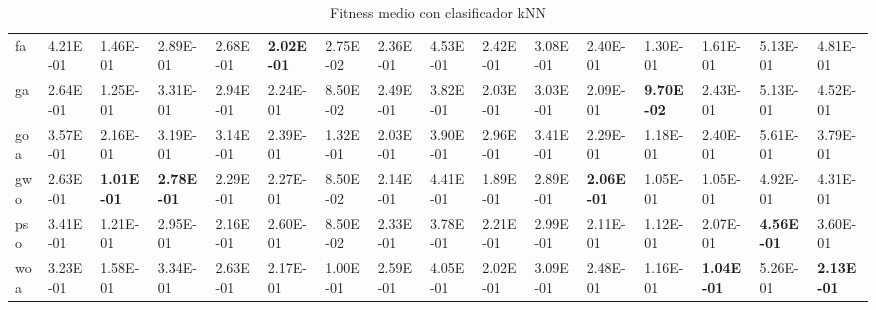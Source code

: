 \begin{table}
\begin{adjustbox}{width=\linewidth}
\begin{tabular}{llllllllllllllll}
            fa        & 4.21E-01          & 1.46E-01          & 2.89E-01          & 2.68E-01          & \textbf{2.02E-01} & 2.75E-02          & 2.36E-01          & 4.53E-01          & 2.42E-01          & 3.08E-01          & 2.40E-01          & 1.30E-01          & 1.61E-01          & 5.13E-01          & 4.81E-01\tabularnewline
            ga        & 2.64E-01          & 1.25E-01          & 3.31E-01          & 2.94E-01          & 2.24E-01          & 8.50E-02          & 2.49E-01          & 3.82E-01          & 2.03E-01          & 3.03E-01          & 2.09E-01          & \textbf{9.70E-02} & 2.43E-01          & 5.13E-01          & 4.52E-01\tabularnewline
            goa       & 3.57E-01          & 2.16E-01          & 3.19E-01          & 3.14E-01          & 2.39E-01          & 1.32E-01          & 2.03E-01          & 3.90E-01          & 2.96E-01          & 3.41E-01          & 2.29E-01          & 1.18E-01          & 2.40E-01          & 5.61E-01          & 3.79E-01\tabularnewline
            gwo       & 2.63E-01          & \textbf{1.01E-01} & \textbf{2.78E-01} & 2.29E-01          & 2.27E-01          & 8.50E-02          & 2.14E-01          & 4.41E-01          & 1.89E-01          & 2.89E-01          & \textbf{2.06E-01} & 1.05E-01          & 1.05E-01          & 4.92E-01          & 4.31E-01\tabularnewline
            pso       & 3.41E-01          & 1.21E-01          & 2.95E-01          & 2.16E-01          & 2.60E-01          & 8.50E-02          & 2.33E-01          & 3.78E-01          & 2.21E-01          & 2.99E-01          & 2.11E-01          & 1.12E-01          & 2.07E-01          & \textbf{4.56E-01} & 3.60E-01\tabularnewline
            woa       & 3.23E-01          & 1.58E-01          & 3.34E-01          & 2.63E-01          & 2.17E-01          & 1.00E-01          & 2.59E-01          & 4.05E-01          & 2.02E-01          & 3.09E-01          & 2.48E-01          & 1.16E-01          & \textbf{1.04E-01} & 5.26E-01          & \textbf{2.13E-01}\tabularnewline
            \bottomrule
        \end{tabular}
    \end{adjustbox}
    \caption{Fitness medio con clasificador kNN}
    \label{tab:fitness_knn}
\end{table}

